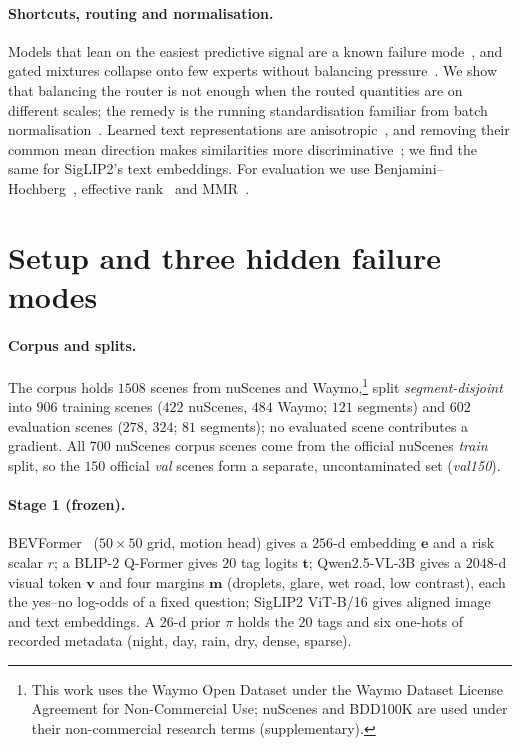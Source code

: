 \documentclass[10pt,twocolumn,letterpaper]{article}
\begin{document}
\paragraph{Shortcuts, routing and normalisation.} Models that lean on the
easiest predictive signal are a known failure mode~\cite{geirhos2020shortcut}, and
gated mixtures collapse onto few experts without balancing
pressure~\cite{shazeer2017moe}. We show that balancing the router is not enough when
the routed quantities are on different scales; the remedy is the running
standardisation familiar from batch normalisation~\cite{ioffe2015bn}. Learned text
representations are anisotropic~\cite{ethayarajh2019anisotropy}, and removing
their common mean direction makes similarities more
discriminative~\cite{mu2018allbutthetop}; we find the same for SigLIP2's text
embeddings. For evaluation we use
Benjamini--Hochberg~\cite{benjamini1995fdr}, effective rank~\cite{roy2007erank} and
MMR~\cite{carbonell1998mmr}.

\section{Setup and three hidden failure modes}
\label{sec:audit}

\paragraph{Corpus and splits.} The corpus holds $1508$ scenes from nuScenes and
Waymo,\footnote{This work uses the Waymo Open Dataset under the Waymo Dataset
License Agreement for Non-Commercial Use; nuScenes and BDD100K are used under their
non-commercial research terms (supplementary).} split \emph{segment-disjoint} into
$906$ training scenes ($422$ nuScenes, $484$ Waymo; $121$ segments) and $602$
evaluation scenes ($278$, $324$; $81$ segments); no evaluated scene contributes a
gradient. All $700$ nuScenes corpus scenes come from the official nuScenes
\emph{train} split, so the $150$ official \emph{val} scenes form a separate,
uncontaminated set (\emph{val150}).

\paragraph{Stage 1 (frozen).} BEVFormer~\cite{li2022bevformer} ($50\times50$ grid,
motion head) gives a $256$-d embedding $\mathbf{e}$ and a risk scalar $r$; a BLIP-2
Q-Former gives $20$ tag logits $\mathbf{t}$; Qwen2.5-VL-3B gives a $2048$-d visual
token $\mathbf{v}$ and four margins $\mathbf{m}$ (droplets, glare, wet road, low
contrast), each the yes--no log-odds of a fixed question; SigLIP2 ViT-B/16 gives
aligned image and text embeddings. A $26$-d prior $\pi$ holds the $20$ tags and six
one-hots of recorded metadata (night, day, rain, dry, dense, sparse).
\end{document}
